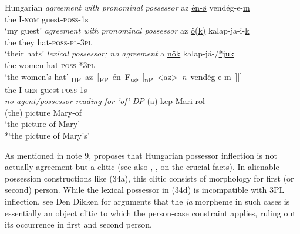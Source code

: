 \documentclass[output=paper
,modfonts
,nonflat]{langsci/langscibook}
\begin{document}
\begin{exe}
	\ex Hungarian \citep[90]{Szabolcsi1983}
	\xlist
	\ex \textit{agreement with pronominal possessor} \newline
	\gll az   \underline{én-ø} vendég-e-\underline{m}\\
	the I-\textsc{nom} guest-\textsc{poss}{}-1s\\
	\glt `my guest'  	
	\ex \textit{agreement with pronominal possessor} \newline
	\gll az   \underline{\H{o}(k)}  kalap-ja-i-\underline{k}\\
	the they hat-\textsc{poss}{}-\textsc{pl}{}-\textsc{3pl}\\
	\glt `their hats'
	\ex \textit{lexical possessor; no agreement}\newline
	\gll  a   \underline{n\H{o}k}       kalap-já-/\underline{*juk}\\
	the   women hat-\textsc{poss}{}-*\textsc{3pl}\\
	\glt `the women's hat' 
	\ex 
	\gll \mbox{{\lbrack}\textsubscript{DP} az [\textsubscript{FP} én    F\textsubscript{u}\textsubscript{$\phi$} [\textsubscript{nP} <az> \textit{n} vendég-e-m ]]]{\rbrack}}\\
	\hspace{0.6cm}the      \hspace{-5.4cm}I-\textsc{gen}                     \hspace{-2.7cm}guest-\textsc{poss}-1s\\
	\ex \textit{no agent/possessor reading for 'of' DP} \newline
	\gll (a) kep       Mari-rol\\
	(the) picture Mary-of\\
	\glt `the picture of Mary'\\ {*}`the picture of Mary's'
	\endxlist
\end{exe}
As mentioned in note 9, \citet{Den_Dikken2015} proposes that Hungarian possessor inflection is not actually agreement but a clitic (see also \citealt{Den_Dikken1999}, \citealt{Bartos1999}, \citealt{Kiss2002} on the crucial facts). In alienable possession constructions like (34a), this clitic consists of morphology for first (or second) person. While the lexical possessor in (34d) is incompatible with 3PL inflection, see Den Dikken for arguments that the \textit{ja} morpheme in such cases is essentially an object clitic to which the person-case constraint applies, ruling out its occurrence in first and second person. 
\end{document}
